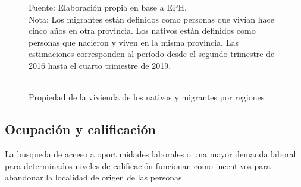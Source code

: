 \documentclass[12pt,a4paper]{article}
\begin{document}
\begin{figure}[htbp!]
\begin{center}
\caption{\\Propiedad de la vivienda de los nativos y migrantes por regiones}
\label{figure:vivienda_mig}
 
\end{center}
\begin{flushleft}
\begin{scriptsize}
Fuente: Elaboración propia en base a EPH.\\
Nota: Los migrantes están definidos como personas que vivían hace cinco años en otra provincia. Los nativos están definidos como personas que nacieron y viven en la misma provincia. Las estimaciones corresponden al período desde el segundo trimestre de 2016 hasta el cuarto trimestre de 2019.\\
\end{scriptsize}
\end{flushleft}
\end{figure}
 


% 
\subsection{Ocupación y calificación}
La busqueda de acceso a oportunidades laborales o una mayor demanda laboral para determinados niveles de calificación funcionan como incentivos para abandonar la localidad de origen de las personas.
\end{document}
